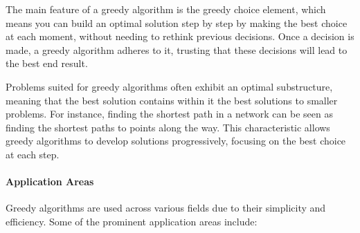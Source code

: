 \documentclass{article}
\begin{document}
    The main feature of a greedy algorithm is the greedy choice element, which means you can build an optimal solution step by step by making the best choice at each moment, without needing to rethink previous decisions. Once a decision is made, a greedy algorithm adheres to it, trusting that these decisions will lead to the best end result.

    Problems suited for greedy algorithms often exhibit an optimal substructure, meaning that the best solution contains within it the best solutions to smaller problems. For instance, finding the shortest path in a network can be seen as finding the shortest paths to points along the way. This characteristic allows greedy algorithms to develop solutions progressively, focusing on the best choice at each step. \cite{izadkhah2022greedy}

    \paragraph{Application Areas}

    Greedy algorithms are used across various fields due to their simplicity and efficiency. Some of the prominent application areas include:
\end{document}
